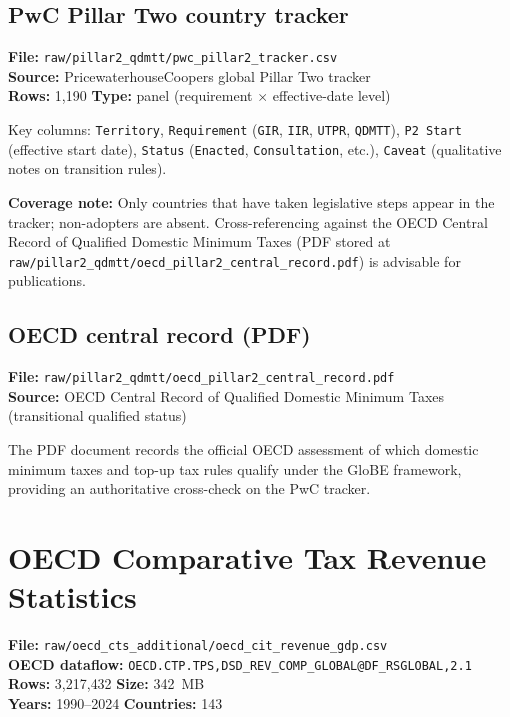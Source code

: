 \documentclass[11pt,a4paper]{article}
\begin{document}
\subsection{PwC Pillar Two country tracker}

\textbf{File:} \texttt{raw/pillar2\_qdmtt/pwc\_pillar2\_tracker.csv}\\
\textbf{Source:} PricewaterhouseCoopers global Pillar Two tracker\\
\textbf{Rows:} 1{,}190 \quad \textbf{Type:} panel (requirement $\times$ effective-date level)

Key columns: \texttt{Territory}, \texttt{Requirement} (\texttt{GIR}, \texttt{IIR}, \texttt{UTPR}, \texttt{QDMTT}), \texttt{P2 Start} (effective start date), \texttt{Status} (\texttt{Enacted}, \texttt{Consultation}, etc.), \texttt{Caveat} (qualitative notes on transition rules).

\noindent\textbf{Coverage note:} Only countries that have taken legislative steps appear in the tracker; non-adopters are absent.  Cross-referencing against the OECD Central Record of Qualified Domestic Minimum Taxes (PDF stored at \texttt{raw/pillar2\_qdmtt/oecd\_pillar2\_central\_record.pdf}) is advisable for publications.

\subsection{OECD central record (PDF)}

\textbf{File:} \texttt{raw/pillar2\_qdmtt/oecd\_pillar2\_central\_record.pdf}\\
\textbf{Source:} OECD Central Record of Qualified Domestic Minimum Taxes (transitional qualified status)

The PDF document records the official OECD assessment of which domestic minimum taxes and top-up tax rules qualify under the GloBE framework, providing an authoritative cross-check on the PwC tracker.


\section{OECD Comparative Tax Revenue Statistics}\label{sec:cts}

\textbf{File:} \texttt{raw/oecd\_cts\_additional/oecd\_cit\_revenue\_gdp.csv}\\
\textbf{OECD dataflow:} \texttt{OECD.CTP.TPS,DSD\_REV\_COMP\_GLOBAL@DF\_RSGLOBAL,2.1}\\
\textbf{Rows:} 3{,}217{,}432 \quad \textbf{Size:} 342~MB\\
\textbf{Years:} 1990--2024 \quad \textbf{Countries:} 143
\end{document}

